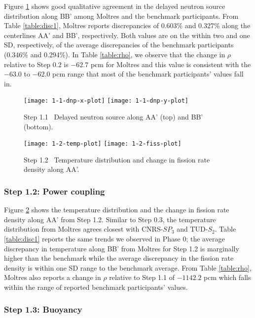 Figure \ref{fig:1.1} shows good qualitative agreement in the delayed neutron
source distribution along BB' among Moltres and the benchmark participants.
From Table \ref{table:disc1}, Moltres reports discrepancies of 0.603\% and
0.327\% along the centerlines AA' and BB', respectively. Both values are on the
within two and one \gls{SD}, respectively, of the average discrepancies of the
benchmark participants (0.346\% and 0.294\%).
In Table \ref{table:rho}, we observe that the change in
$\rho$ relative to Step 0.2 is $-62.7$ pcm for Moltres and this value is
consistent with the $-63.0$ to $-62.0$ pcm range that most of the benchmark
participants' values fall in.
%
\begin{figure}[htb]
	\centering
    \texttt{[image: 1-1-dnp-x-plot]}
    \texttt{[image: 1-1-dnp-y-plot]}
	\caption{Step 1.1 \textemdash\ Delayed neutron source along AA' (top) and BB'
	(bottom).}
	\label{fig:1.1}
\end{figure}
%
\begin{figure}[htb]
	\centering
	\texttt{[image: 1-2-temp-plot]}
	\texttt{[image: 1-2-fiss-plot]}
	\caption{Step 1.2 \textemdash\ Temperature distribution and change in fission rate
	density along AA'.}
	\label{fig:1.2}
\end{figure}

\FloatBarrier

\subsubsection{Step 1.2: Power coupling}

Figure \ref{fig:1.2} shows the temperature distribution and the change in
fission rate density along AA' from Step 1.2. Similar to Step 0.3, the
temperature distribution from Moltres agrees closest with CNRS-$SP_3$ and
TUD-$S_2$. Table \ref{table:disc1} reports the same trends we observed in Phase
0; the average discrepancy in temperature along BB' from Moltres for Step 1.2
is marginally higher than the benchmark while the average discrepancy in the
fission rate density is within one \gls{SD} range to the benchmark average.
From Table \ref{table:rho}, Moltres also reports a change in $\rho$
relative to Step 1.1 of $-1142.2$ pcm which
falls within the range of reported benchmark participants' values.

\subsubsection{Step 1.3: Buoyancy}

